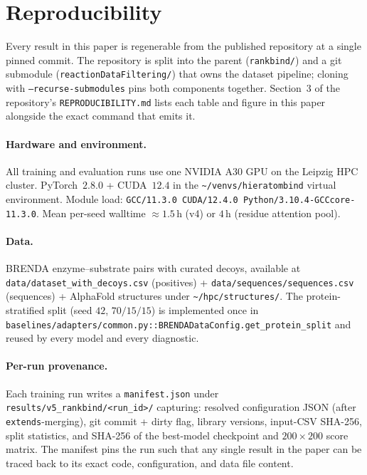 \documentclass[11pt,a4paper]{article}
\begin{document}
\appendix
\section{Reproducibility}
\label{app:repro}

Every result in this paper is regenerable from the published
repository at a single pinned commit. The repository is split into the
parent (\texttt{rankbind/}) and a git submodule
(\texttt{reactionDataFiltering/}) that owns the dataset pipeline;
cloning with \texttt{--recurse-submodules} pins both components
together. Section~3 of the repository's \texttt{REPRODUCIBILITY.md}
lists each table and figure in this paper alongside the exact command
that emits it.

\paragraph{Hardware and environment.}
All training and evaluation runs use one NVIDIA A30 GPU on the
Leipzig HPC cluster. PyTorch~$2.8.0$ + CUDA~$12.4$ in the
\texttt{\textasciitilde/venvs/hieratombind} virtual environment.
Module load: \texttt{GCC/11.3.0 CUDA/12.4.0 Python/3.10.4-GCCcore-11.3.0}.
Mean per-seed walltime $\approx 1.5$\,h (v4) or $4$\,h (residue attention pool).

\paragraph{Data.}
BRENDA enzyme--substrate pairs with curated decoys, available at
\texttt{data/dataset\_with\_decoys.csv} (positives) +
\texttt{data/sequences/sequences.csv} (sequences) + AlphaFold
structures under \texttt{\textasciitilde/hpc/structures/}. The
protein-stratified split (seed $42$, $70/15/15$) is implemented once
in
\texttt{baselines/adapters/common.py::BRENDADataConfig.get\_protein\_split}
and reused by every model and every diagnostic.

\paragraph{Per-run provenance.}
Each training run writes a \texttt{manifest.json} under
\texttt{results/v5\_rankbind/<run\_id>/} capturing: resolved
configuration JSON (after \texttt{extends}-merging), git commit + dirty
flag, library versions, input-CSV SHA-256, split statistics, and
SHA-256 of the best-model checkpoint and $200 \times 200$ score
matrix. The manifest pins the run such that any single result in the
paper can be traced back to its exact code, configuration, and data
file content.
\end{document}
